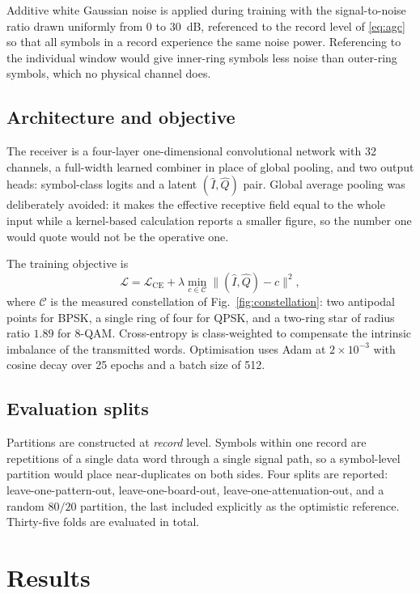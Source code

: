 \documentclass[journal]{IEEEtran}   %
\begin{document}
Additive white Gaussian noise is applied during training with the
signal-to-noise ratio drawn uniformly from $0$ to $30$~dB, referenced to the
record level of \eqref{eq:agc} so that all symbols in a record experience the
same noise power. Referencing to the individual window would give inner-ring
symbols less noise than outer-ring symbols, which no physical channel does.

\subsection{Architecture and objective}
The receiver is a four-layer one-dimensional convolutional network with 32
channels, a full-width learned combiner in place of global pooling, and two
output heads: symbol-class logits and a latent $(\hat{I},\hat{Q})$ pair. Global
average pooling was deliberately avoided: it makes the effective receptive field
equal to the whole input while a kernel-based calculation reports a smaller
figure, so the number one would quote would not be the operative one.

The training objective is
\begin{equation}
\mathcal{L} = \mathcal{L}_{\mathrm{CE}}
  + \lambda \min_{c \in \mathcal{C}}
    \big\lVert (\hat{I},\hat{Q}) - c \big\rVert^2 ,
\label{eq:loss}
\end{equation}
where $\mathcal{C}$ is the measured constellation of
Fig.~\ref{fig:constellation}: two antipodal points for BPSK, a single ring of
four for QPSK, and a two-ring star of radius ratio $1.89$ for 8-QAM.
Cross-entropy is class-weighted to compensate the intrinsic imbalance of the
transmitted words. Optimisation uses Adam at $2\times10^{-3}$ with cosine decay
over 25 epochs and a batch size of 512.

\subsection{Evaluation splits}
Partitions are constructed at \emph{record} level. Symbols within one record are
repetitions of a single data word through a single signal path, so a
symbol-level partition would place near-duplicates on both sides. Four splits
are reported: leave-one-pattern-out, leave-one-board-out,
leave-one-attenuation-out, and a random $80/20$ partition, the last included
explicitly as the optimistic reference. Thirty-five folds are evaluated in
total.

\section{Results}
\end{document}
